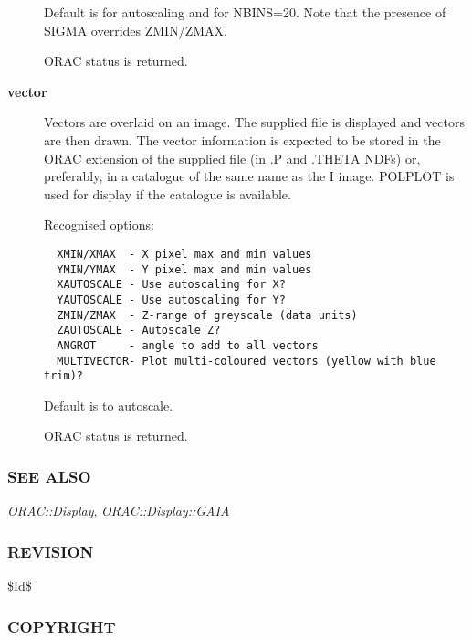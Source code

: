 \begin{description}
Default is for autoscaling and for NBINS=20. Note that the presence of
SIGMA overrides ZMIN/ZMAX.



ORAC status is returned.


\item[{\textbf{vector}}] \mbox{}

Vectors are overlaid on an image. The supplied file is displayed
and vectors are then drawn. The vector information is expected
to be stored in the ORAC extension of the supplied file
(in .P and .THETA NDFs) or, preferably, in a catalogue of the
same name as the I image. POLPLOT is used for display if
the catalogue is available.



Recognised options:

\begin{verbatim}
  XMIN/XMAX  - X pixel max and min values
  YMIN/YMAX  - Y pixel max and min values
  XAUTOSCALE - Use autoscaling for X?
  YAUTOSCALE - Use autoscaling for Y?
  ZMIN/ZMAX  - Z-range of greyscale (data units)
  ZAUTOSCALE - Autoscale Z?
  ANGROT     - angle to add to all vectors
  MULTIVECTOR- Plot multi-coloured vectors (yellow with blue trim)?
\end{verbatim}


Default is to autoscale.



ORAC status is returned.

\end{description}
\subsubsection*{SEE ALSO\label{ORAC::Display::KAPVIEW_SEE_ALSO}}


\emph{ORAC::Display}, \emph{ORAC::Display::GAIA}

\subsubsection*{REVISION\label{ORAC::Display::KAPVIEW_REVISION}}


\$Id\$

\subsubsection*{COPYRIGHT\label{ORAC::Display::KAPVIEW_COPYRIGHT}}


